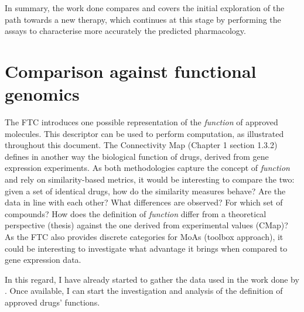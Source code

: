 In summary, the work done compares and covers the initial exploration of the path towards a new therapy, which continues at this stage by performing the assays to characterise more accurately the predicted pharmacology.

\section{Comparison against functional genomics}
The FTC introduces one possible representation of the \emph{function} of approved molecules. This descriptor can be used to perform computation, as illustrated throughout this document. The Connectivity Map (Chapter 1 section 1.3.2) defines in another way the biological function of drugs, derived from gene expression experiments. As both methodologies capture the concept of \emph{function} and rely on similarity-based metrics, it would be interesting to compare the two: given a set of identical drugs, how do the similarity measures behave? Are the data in line with each other? What differences are observed? For which set of compounds? How does the definition of \emph{function} differ from a theoretical perspective (thesis) against the one derived from experimental values (CMap)? As the FTC also provides discrete categories for MoAs (toolbox approach), it could be interesting to investigate what advantage it brings when compared to gene expression data.

In this regard, I have already started to gather the data used in the work done by \cite{iorio2010discovery}. Once available, I can start the investigation and analysis of the definition of approved drugs’ functions.

